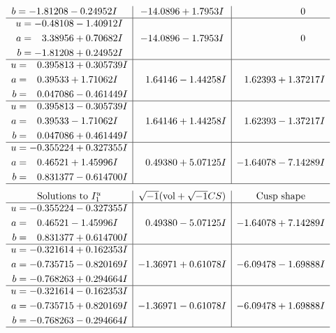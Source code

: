 \documentclass[1p]{elsarticle_modified}
\theoremstyle{definition}
\newcommand{\I}{\sqrt{-1}}
\begin{document}
$$\begin{array}{c|c|c}
\begin{aligned}
b &= -1.81208 - 0.24952 I\end{aligned}
 & -14.0896 + 1.7953 I & \phantom{-0.000000 } 0 \\ \hline\begin{aligned}
u &= -0.48108 - 1.40912 I \\
a &= \phantom{-}3.38956 + 0.70682 I \\
b &= -1.81208 + 0.24952 I\end{aligned}
 & -14.0896 - 1.7953 I & \phantom{-0.000000 } 0 \\ \hline\begin{aligned}
u &= \phantom{-}0.395813 + 0.305739 I \\
a &= \phantom{-}0.39533 + 1.71062 I \\
b &= \phantom{-}0.047086 - 0.461449 I\end{aligned}
 & \phantom{-}1.64146 - 1.44258 I & \phantom{-}1.62393 + 1.37217 I \\ \hline\begin{aligned}
u &= \phantom{-}0.395813 - 0.305739 I \\
a &= \phantom{-}0.39533 - 1.71062 I \\
b &= \phantom{-}0.047086 + 0.461449 I\end{aligned}
 & \phantom{-}1.64146 + 1.44258 I & \phantom{-}1.62393 - 1.37217 I \\ \hline\begin{aligned}
u &= -0.355224 + 0.327355 I \\
a &= \phantom{-}0.46521 + 1.45996 I \\
b &= \phantom{-}0.831377 - 0.614700 I\end{aligned}
 & \phantom{-}0.49380 + 5.07125 I & -1.64078 - 7.14289 I\\
 \hline 
 \end{array}$$\newpage$$\begin{array}{c|c|c}  
\text{Solutions to }I^u_{1}& \I (\text{vol} + \sqrt{-1}CS) & \text{Cusp shape}\\
 \hline 
\begin{aligned}
u &= -0.355224 - 0.327355 I \\
a &= \phantom{-}0.46521 - 1.45996 I \\
b &= \phantom{-}0.831377 + 0.614700 I\end{aligned}
 & \phantom{-}0.49380 - 5.07125 I & -1.64078 + 7.14289 I \\ \hline\begin{aligned}
u &= -0.321614 + 0.162353 I \\
a &= -0.735715 - 0.820169 I \\
b &= -0.768263 + 0.294664 I\end{aligned}
 & -1.36971 + 0.61078 I & -6.09478 - 1.69888 I \\ \hline\begin{aligned}
u &= -0.321614 - 0.162353 I \\
a &= -0.735715 + 0.820169 I \\
b &= -0.768263 - 0.294664 I\end{aligned}
 & -1.36971 - 0.61078 I & -6.09478 + 1.69888 I\\
 \hline 
 \end{array}$$\newpage\newpage\renewcommand{\arraystretch}{1}
\end{document}
